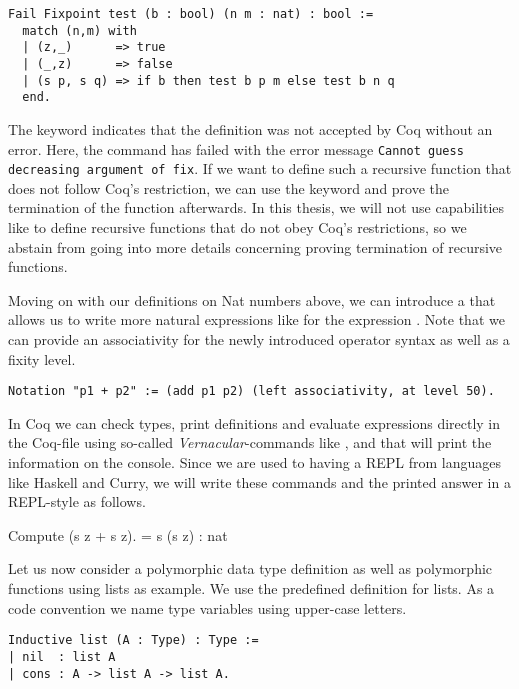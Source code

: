 \begin{verbatim}
Fail Fixpoint test (b : bool) (n m : nat) : bool :=
  match (n,m) with
  | (z,_)      => true
  | (_,z)      => false
  | (s p, s q) => if b then test b p m else test b n q
  end.
\end{verbatim}

The keyword  indicates that the definition was not accepted by Coq without an error.
Here, the command has failed with the error message \texttt{Cannot guess decreasing argument of fix}.
If we want to define such a recursive function that does not follow Coq's restriction, we can use the keyword  and prove the termination of the function afterwards.
In this thesis, we will not use capabilities like  to define recursive functions that do not obey Coq's restrictions, so we abstain from going into more details concerning proving termination of recursive functions.

Moving on with our definitions on Nat numbers above, we can introduce a  that allows us to write more natural expressions like  for
the expression .
Note that we can provide an associativity for the newly introduced operator syntax as well as a fixity level.

\begin{verbatim}
Notation "p1 + p2" := (add p1 p2) (left associativity, at level 50).
\end{verbatim}

In Coq we can check types, print definitions and evaluate expressions directly in the Coq-file using so-called \emph{Vernacular}-commands like ,  and  that will print the information on the console.
Since we are used to having a REPL from languages like Haskell and Curry, we will write these commands and the printed answer in a REPL-style as follows.

\begin{crepl}
\coqrepl Compute (s z + s z).
   = s (s z)
   : nat
\end{crepl}

Let us now consider a polymorphic data type definition as well as polymorphic functions using lists as example.
We use the predefined definition for lists.
As a code convention we name type variables using upper-case letters.

\begin{verbatim}
Inductive list (A : Type) : Type :=
| nil  : list A
| cons : A -> list A -> list A.
\end{verbatim}

